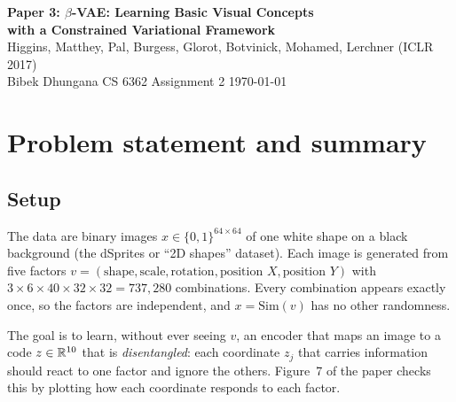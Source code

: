 

\begin{center}
{\LARGE\bfseries Paper 3: $\beta$-VAE: Learning Basic Visual Concepts\\[2pt] with a Constrained Variational Framework}\\[5pt]
{\large Higgins, Matthey, Pal, Burgess, Glorot, Botvinick, Mohamed, Lerchner (ICLR 2017)}\\[4pt]
Bibek Dhungana \quad\textbar\quad CS 6362 Assignment 2 \quad\textbar\quad \today
\end{center}

\section{Problem statement and summary}

\subsection{Setup}
The data are binary images $x\in\{0,1\}^{64\times64}$ of one white shape on a black background (the dSprites or ``2D shapes'' dataset). Each image is generated from five factors $v=(\text{shape},\text{scale},\text{rotation},\text{position }X,\text{position }Y)$ with $3\times6\times40\times32\times32=737{,}280$ combinations. Every combination appears exactly once, so the factors are independent, and $x=\mathrm{Sim}(v)$ has no other randomness.

The goal is to learn, without ever seeing $v$, an encoder that maps an image to a code $z\in\mathbb{R}^{10}$ that is \emph{disentangled}: each coordinate $z_j$ that carries information should react to one factor and ignore the others. Figure~7 of the paper checks this by plotting how each coordinate responds to each factor.

